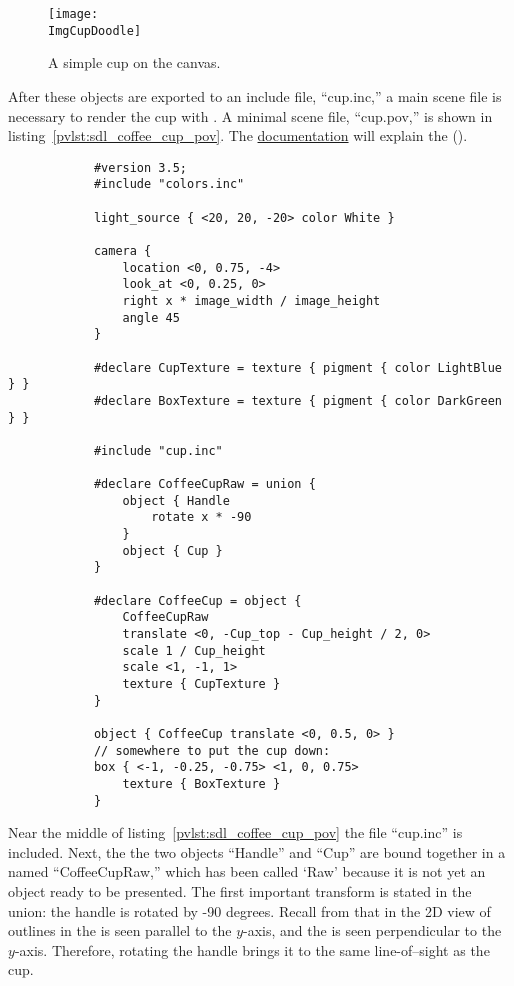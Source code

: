 		\begin{figure}[htbp]
		\centering
		\texttt{[image: \\ImgCupDoodle]}
		\caption{A simple cup on the \dtypkg{} canvas.}
		\label{fig:cup_doodle}
		\end{figure}

		After these objects
		are exported to an include file, ``cup.inc,''
		a main scene file is necessary to render the cup
		with \IXpov{}. A minimal scene file, ``cup.pov,'' is shown in
		listing~\ref{pvlst:sdl_coffee_cup_pov}.
		The \IXpov{}
		\href{http://www.povray.org/documentation/}{documentation}
		will explain the  ().
		
		\begin{povsdl}
			{\small
			\begin{verbatim}
			#version 3.5;
			#include "colors.inc"
			
			light_source { <20, 20, -20> color White }
			
			camera {
			    location <0, 0.75, -4>
			    look_at <0, 0.25, 0>
			    right x * image_width / image_height
			    angle 45
			}
			
			#declare CupTexture = texture { pigment { color LightBlue } }
			#declare BoxTexture = texture { pigment { color DarkGreen } }
			
			#include "cup.inc"
			
			#declare CoffeeCupRaw = union {
			    object { Handle
			        rotate x * -90
			    }
			    object { Cup }
			}
			
			#declare CoffeeCup = object {
			    CoffeeCupRaw
			    translate <0, -Cup_top - Cup_height / 2, 0>
			    scale 1 / Cup_height
			    scale <1, -1, 1>
			    texture { CupTexture }
			}
			
			object { CoffeeCup translate <0, 0.5, 0> }
			// somewhere to put the cup down:
			box { <-1, -0.25, -0.75> <1, 0, 0.75>
			    texture { BoxTexture }
			}
			\end{verbatim}
			}%
		\caption{\dtypov{} SDL for a simple coffee cup scene.}
		\label{pvlst:sdl_coffee_cup_pov}
		\end{povsdl}

		Near the middle of listing~\ref{pvlst:sdl_coffee_cup_pov}
		the file
		``cup.inc'' is included. Next, the the two objects
		``Handle'' and ``Cup'' are bound together in a
		 named ``CoffeeCupRaw,'' which has
		been called `Raw' because it is
		not yet an object ready to be presented.
		The first important transform is stated in the union:
		the handle is rotated by -90 degrees. Recall from
		 that in the
		2D view of outlines in \IXpkg{} the \IXprism{} is seen
		parallel to the $y$-axis, and the \IXlathe{} is seen
		perpendicular to the $y$-axis. Therefore, rotating
		the handle brings it to the same line-of--sight as
		the cup.
		
